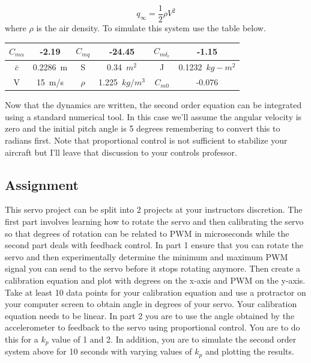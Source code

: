 \begin{equation}
q_{\infty} = \frac{1}{2}\rho V^2
\end{equation}
where $\rho$ is the air density. To simulate this system use the table below.
\begin{table}[H]
\begin{center}
\begin{tabular}{c|c|c|c|c|c}
$C_{m\alpha}$ & -2.19 & $C_{mq}$ & -24.45 & $C_{m\delta_e}$ & -1.15 \\
\hline
$\bar{c}$ & 0.2286~m & S & 0.34~$m^2$ & J & 0.1232~$kg-m^2$ \\
\hline
V & 15~m/s & $\rho$ & 1.225~$kg/m^3$ & $C_{m0}$ & -0.076 \\
\end{tabular}
\end{center}
\end{table}
Now that the dynamics are written, the second order equation can be integrated using a standard numerical tool. In this case we'll assume the angular velocity is zero and the initial pitch angle is 5 degrees remembering to convert this to radians first. Note that proportional control is not sufficient to stabilize your aircraft but I’ll leave that discussion to your controls professor. 

\subsection{Assignment}

This servo project can be split into 2 projects at your instructors discretion. The first part involves learning how to rotate the servo and then calibrating the servo so that degrees of rotation can be related to PWM in microseconds while the second part deals with feedback control. In part 1 ensure that you can rotate the servo and then experimentally determine the minimum and maximum PWM signal you can send to the servo before it stops rotating anymore. Then create a calibration equation and plot with degrees on the x-axis and PWM on the y-axis. Take at least 10 data points for your calibration equation and use a protractor on your computer screen to obtain angle in degrees of your servo. Your calibration equation needs to be linear. In part 2 you are to use the angle obtained by the accelerometer to feedback to the servo using proportional control. You are to do this for a $k_p$ value of 1 and 2. In addition, you are to simulate the second order system above for 10 seconds with varying values of $k_p$ and plotting the results.

